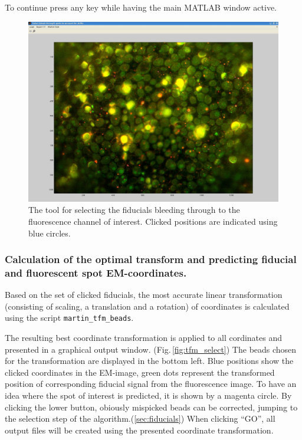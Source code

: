 \documentclass[10pt,a4paper,onepage,DIV12]{scrartcl}
\begin{document}
To continue press any key while having the main MATLAB window active.\\

\begin{figure}
 \centering
 \includegraphics[width=.78\textwidth]{images/digitize.jpg}
 \caption{The tool for selecting the fiducials bleeding through to the fluorescence channel of interest. Clicked positions are indicated using blue circles.}
 \label{fig:digitize}
\end{figure}

\subsubsection{Calculation of the optimal transform and predicting fiducial and fluorescent spot EM-coordinates.}
Based on the set of clicked fiducials, the most accurate linear transformation (consisting of scaling, a translation and a rotation) of coordinates is calculated using the script \texttt{martin\_tfm\_beads}.


% 

The resulting best coordinate transformation is applied to all cordinates and presented in a graphical output window. (Fig.\,\ref{fig:tfm_select}) The beads chosen for the transformation are displayed in the bottom left. Blue positions show the clicked coordinates in the EM-image, green dots represent the transformed position of corresponding fiducial signal from the fluorescence image. To have an idea where the spot of interest is predicted, it is shown by a magenta circle. By clicking the lower button, obiously mispicked beads can be corrected, jumping to the selection step of the algorithm.(\ref{sec:fiducials}) When clicking ``GO'', all output files will be created using the presented coordinate transformation.\\
\end{document}
